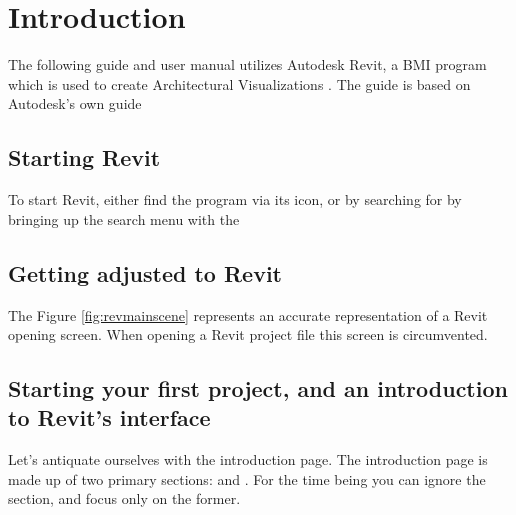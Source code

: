 \documentclass{tufte-book} %
\begin{document}

\tableofcontents %


\listoffigures %






\cleardoublepage
\chapter{Introduction} %
\label{ch:0}

The following guide and user manual utilizes Autodesk Revit, a BMI program which is used to create Architectural Visualizations \cite{revit2016}. The guide is based on Autodesk's own guide \cite{guide2006}


\section{Starting Revit}


To start Revit, either find the program via its icon, or by searching for  by bringing up the search menu with the 

\section{Getting adjusted to Revit}
The Figure \ref{fig:revmainscene} represents an accurate representation of a Revit opening screen. When opening a Revit project file this screen is circumvented.

\section{Starting your first project, and an introduction to Revit's interface}
Let's antiquate ourselves with the introduction page. The introduction page is made up of two primary sections:  and . For the time being you can ignore the  section, and focus only on the former.
\end{document}
